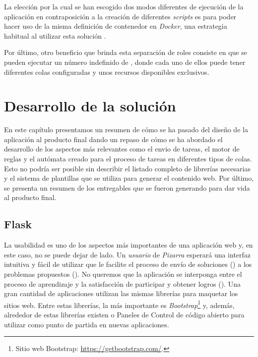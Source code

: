 \documentclass[11pt,spanish,listoffigures,listoftables]{tfgetsinf}
\begin{document}
La elección por la cual se han escogido dos modos diferentes de ejecución de la aplicación en contraposición a la creación de diferentes \textit{scripts} es para poder hacer uso de la misma definición de contenedor en \textit{Docker}, una estrategia habitual al utilizar esta solución \cite{link-sharing-docker-containers}.

Por último, otro beneficio que brinda esta separación de roles consiste en que se pueden ejecutar un número indefinido de , donde cada uno de ellos puede tener diferentes colas configuradas y unos recursos disponibles exclusivos.

\chapter{Desarrollo de la solución}

En este capítulo presentamos un resumen de cómo se ha pasado del diseño de la aplicación al producto final dando un repaso de cómo se ha abordado el desarrollo de los aspectos más relevantes como el \gls{envio} de \gls{tarea}s, el motor de reglas y el autómata creado para el proceso de tareas en diferentes tipos de \gls{cola}s. Esto no podría ser posible sin describir el listado completo de librerías necesarias y el sistema de plantillas que se utiliza para generar el contenido web. Por último, se presenta un resumen de los entregables que se fueron generando para dar vida al producto final.

\section{Flask }

La usabilidad es uno de los aspectos más importantes de una aplicación web y, en este caso, no se puede dejar de lado. Un \textit{usuario} de \textit{Pizarra} esperará una interfaz intuitiva y fácil de utilizar que le facilite el proceso de envío de soluciones () a los problemas propuestos (). No queremos que la aplicación se interponga entre el proceso de aprendizaje y la satisfacción de participar y obtener logros (). Una gran cantidad de aplicaciones utilizan las mismas librerías para maquetar los sitios web. Entre estas librerías, la más importante es \textit{Bootstrap}\footnote{Sitio web Bootstrap: \url{https://getbootstrap.com/}.} y, además, alrededor de estas librerías existen  o Paneles de Control de código abierto para utilizar como punto de partida en nuevas aplicaciones.
	
\end{document}
